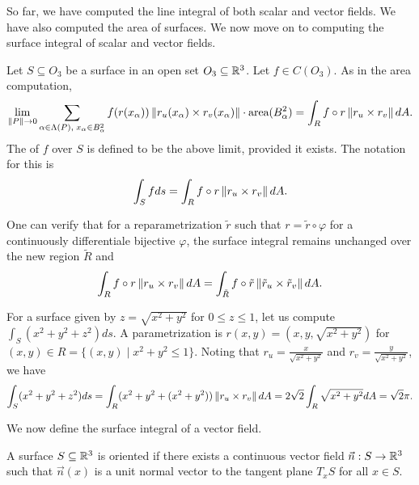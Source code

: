 So far, we have computed the line integral of both scalar and vector fields. We have also computed the area of surfaces. We now move on to computing the surface integral of scalar and vector fields.

\begin{definition}
    Let $S \subseteq O_{3}$ be a surface in an open set $O_{3} \subseteq \mathbb{R}^{3}$. Let $f \in C(O_{3})$. As in the area computation,
    \begin{align}
        \lim_{\left\lVert P\right\rVert \to 0} \sum_{\alpha \in \Lambda(P),\;x_{\alpha} \in B_{\alpha}^{2}} f(r(x_{\alpha})) \left\lVert r_{u}(x_{\alpha}) \times r_{v}(x_{\alpha})\right\rVert \cdot \text{area}(B_{\alpha}^{2}) = \int_{R} f \circ r \left\lVert r_{u} \times r_{v}\right\rVert dA.
    \end{align}
    The  of $f$ over $S$ is defined to be the above limit, provided it exists. The notation for this is
    \begin{align}
        \int_{S} f ds = \int_{R} f \circ r \left\lVert r_{u} \times r_{v}\right\rVert dA.
    \end{align}
\end{definition}

One can verify that for a reparametrization $\tilde{r}$ such that $r = \tilde{r} \circ \varphi$ for a continuously differentiale bijective $\varphi$, the surface integral remains unchanged over the new region $\tilde{R}$ and
\begin{align}
    \int_{R} f \circ r \left\lVert r_{u} \times r_{v}\right\rVert dA = \int_{\tilde{R}} f \circ \tilde{r} \left\lVert\tilde{r}_{u} \times \tilde{r}_{v}\right\rVert dA.
\end{align}

\begin{example}
    For a surface given by $z = \sqrt{x^{2}+y^{2}}$ for $0 \leq z \leq 1$, let us compute $\int_{S} (x^{2}+y^{2}+z^{2}) ds$. A parametrization is $r(x,y) = (x,y,\sqrt{x^{2}+y^{2}})$ for $(x,y) \in R = \{(x,y) \mid x^{2}+y^{2} \leq 1\}$. Noting that $r_{u} = \frac{x}{\sqrt{x^{2}+y^{2}}}$ and $r_{v} = \frac{y}{\sqrt{x^{2}+y^{2}}}$, we have
    \begin{align}
        \int_{S} (x^{2}+y^{2}+z^{2}) ds = \int_{R} (x^{2}+y^{2}+(x^{2}+y^{2})) \left\lVert r_{u} \times r_{v}\right\rVert dA = 2\sqrt{2} \int_{R} \sqrt{x^{2}+y^{2}} dA = \sqrt{2} \pi.
    \end{align}
\end{example}

We now define the surface integral of a vector field.

\begin{definition}
    A surface $S \subseteq \mathbb{R}^{3}$ is oriented if there exists a continuous vector field $\vec{n}:S \to \mathbb{R}^{3}$ such that $\vec{n}(x)$ is a unit normal vector to the tangent plane $T_{x}S$ for all $x \in S$.
\end{definition}

